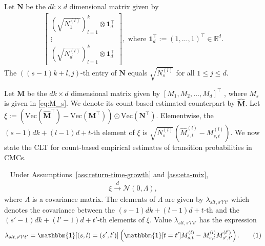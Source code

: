\documentclass[twoside,11pt]{article}
\newcommand{\pow}[1]{^{(#1)}}%
\renewcommand{\Vec}[1]{\text{Vec}\lp #1\rp}
\numberwithin{equation}{section}
\newcommand{\lp}{\left(}
\newcommand{\rp}{\right)}
\newcommand{\Rbb}{\mathbb{R}}
\newcommand{\Ncal}{\mathcal{N}}
\newcommand\numberthis{\addtocounter{equation}{1}\tag{\theequation}}
\newcommand{\indicator}{\mathbbm{1}}
\begin{document}
Let $\mathbf{N}$ be the $dk\times d$ dimensional matrix given by
\begin{align*}
\begin{bmatrix}
     \lp\sqrt{N_1\pow l}\rp_{l=1}^k \otimes \mathbf{1}_d^\top\\
     \vdots\\
    \lp\sqrt{N_d\pow l}\rp_{l=1}^k \otimes \mathbf{1}_d^\top 
\end{bmatrix}, \text{ where } \mathbf{1}_d^\top := (1,\dots,1)^\top \in \Rbb^d.
\end{align*}
The $((s-1)k+l, j)$-th entry of $\mathbf{N}$ equals $\sqrt{N \pow l_s}$ for all $1 \leq j \leq d$.

Let $\mathbf{M}$ be the $dk\times d$ dimensional matrix given by $[M_1, M_2,\dots, M_d]^\top$ , where $M_s$ is given in \cref{eq:M_s}.
We denote its count-based estimated counterpart by $\mathbf{\hat M}$.
Let $\xi:=\lp\Vec{\mathbf{\hat M}^\top}-\Vec{\mathbf{M}^\top}\rp\odot\Vec{\mathbf{N}^\top}$. 
Elementwise, the $(s-1)dk+(l-1)d+t$-th element of $\xi$ is
$\sqrt{N_s\pow l}\lp{\hat M_{s,t}\pow l-M_{s,t}\pow l}\rp$.
We now state the CLT for count-based empirical estimates of transition probabilities in CMCs.
\begin{theorem}~\label{thm:eta-clt}
    Under Assumptions~\ref{ass:return-time-growth} and \ref{ass:eta-mix}, 
    \begin{align*}
    \xi  \overset{d}{\rightarrow} \Ncal(0,\Lambda),
    \end{align*}
    where $\Lambda$ is a covariance matrix. The elements of $\Lambda$ are given by $\lambda_{slt,s'l't'}$ which denotes the covariance between the $(s-1)dk+(l-1)d+t$-th and the $(s'-1)dk+(l'-1)d+t'$-th elements of $\xi$.
    Value $\lambda_{slt,s'l't'}$ has the expression
    \begin{align*}
    \lambda_{slt,s'l't'} = \indicator[(s,l)=(s',l')]\lp \indicator[t=t'] M_{s,t}\pow l-M_{s,t}\pow l M_{s',t'}\pow {l'}\rp.\numberthis\label{eq:correlation} 
    \end{align*}
\end{theorem}
\end{document}
